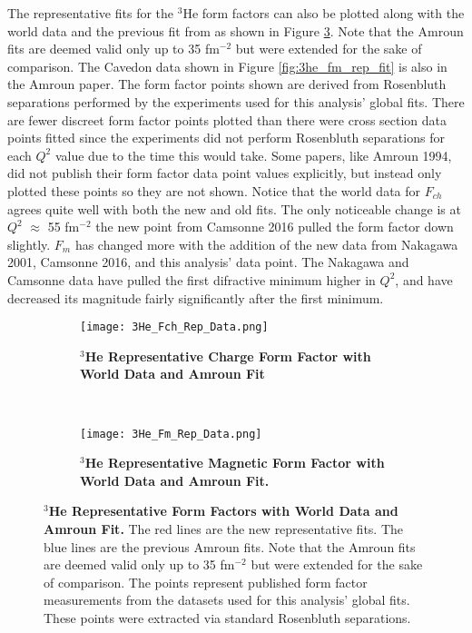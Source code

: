 The representative fits for the $^3$He form factors can also be plotted along with the world data and the previous fit from \cite{Article:Amroun} as shown in Figure \ref{fig:3he_rep_data}. Note that the Amroun fits are deemed valid only up to 35 fm$^{-2}$ but were extended for the sake of comparison. The Cavedon data \cite{Article:Cavedon} shown in Figure \ref{fig:3he_fm_rep_fit} is also in the Amroun paper. The form factor points shown are derived from Rosenbluth separations performed by the experiments used for this analysis' global fits. There are fewer discreet form factor points plotted than there were cross section data points fitted since the experiments did not perform Rosenbluth separations for each $Q^2$ value due to the time this would take. Some papers, like Amroun 1994, did not publish their form factor data point values explicitly, but instead only plotted these points so they are not shown. Notice that the world data for $F_{ch}$ agrees quite well with both the new and old fits. The only noticeable change is at $Q^2$ $\approx$ 55 fm$^{-2}$ the new point from Camsonne 2016 pulled the form factor down slightly. $F_m$ has changed more with the addition of the new data from Nakagawa 2001, Camsonne 2016, and this analysis' data point. The Nakagawa and Camsonne data have pulled the first difractive minimum higher in $Q^2$, and have decreased its magnitude fairly significantly after the first minimum.

 \begin{figure}[!ht]
\begin{subfigure}{1.\textwidth}
  \centering
  \texttt{[image: 3He\_Fch\_Rep\_Data.png]}
  \caption{\bf{$^3$He Representative Charge Form Factor with World Data and Amroun Fit}}
  \label{fig:3he_fch_rep_data}
\end{subfigure}\\
\begin{subfigure}{1.\textwidth}
  \centering
  \texttt{[image: 3He\_Fm\_Rep\_Data.png]}
  \caption{\bf{$^3$He Representative Magnetic Form Factor with World Data and Amroun Fit.}}
  \label{fig:3he_fm_rep_data}
\end{subfigure}
\caption[$^3$He Representative Form Factors with World Data and Amroun Fit] {
{\bf{$^3$He Representative Form Factors with World Data and Amroun Fit.}} The red lines are the new representative fits. The blue lines are the previous Amroun fits. Note that the Amroun fits are deemed valid only up to 35 fm$^{-2}$ but were extended for the sake of comparison. The points represent published form factor measurements from the datasets used for this analysis' global fits. These points were extracted via standard Rosenbluth separations.}
\label{fig:3he_rep_data}
\end{figure}

